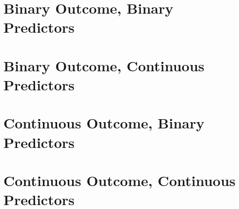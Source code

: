
\section[Binary Y, binary X]{Binary Outcome, Binary Predictors}
\section[Binary Y, continuous X]{Binary Outcome, Continuous Predictors}
\section[Continuous Y, binary X]{Continuous Outcome, Binary Predictors}
\section[Continuous Y, continuous X]{Continuous Outcome, Continuous Predictors}
